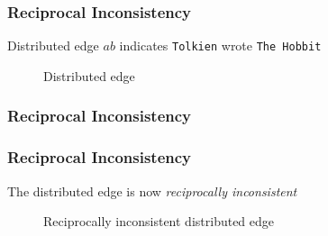\begin{frame}
  \frametitle{Reciprocal Inconsistency}
  Distributed edge $ab$ indicates \texttt{Tolkien} wrote \texttt{The Hobbit}
  \begin{figure}
    \centering
    
    \caption{Distributed edge}
  \end{figure}
\end{frame}

\begin{frame}
  \frametitle{Reciprocal Inconsistency}
  \begin{itemize}
  \end{itemize}

  \begin{figure}
    \centering
  \end{figure}
\end{frame}

\begin{frame}
  \frametitle{Reciprocal Inconsistency}
  The distributed edge is now \emph{reciprocally inconsistent}
  \begin{figure}
    \centering
    
    \caption{Reciprocally inconsistent distributed edge}
  \end{figure}
\end{frame}


